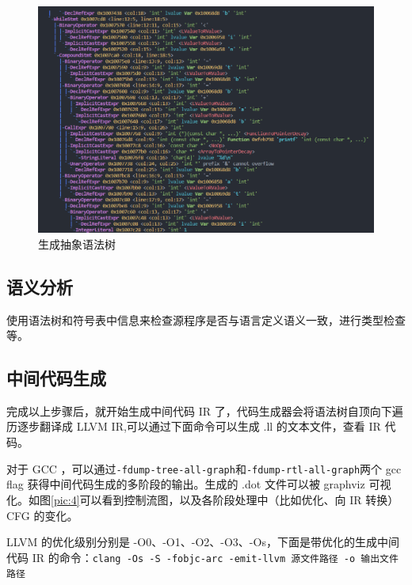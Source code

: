\documentclass[UTF8,a4paper,10pt]{ctexart}
\begin{document}
\begin{figure}[H]
  \centering
  \includegraphics[width=\textwidth]{figure/AST.png}
  \caption{生成抽象语法树}
  \label{pic:3}
\end{figure}

\subsection{语义分析}
使用语法树和符号表中信息来检查源程序是否与语言定义语义一致，进行类型检查等。

\subsection{中间代码生成}
完成以上步骤后，就开始生成中间代码 IR 了，代码生成器会将语法树自顶向下遍历逐步翻译成 LLVM IR,可以通过下面命令可以生成 .ll 的文本文件，查看 IR 代码。

对于 GCC ，可以通过\verb|-fdump-tree-all-graph|和\verb|-fdump-rtl-all-graph|两个 gcc flag 获得中间代码生成的多阶段的输出。生成的 .dot 文件可以被 graphviz 可视化。如图\ref{pic:4}可以看到控制流图，以及各阶段处理中（比如优化、向 IR 转换）CFG 的变化。

LLVM 的优化级别分别是 -O0、-O1、-O2、-O3、-Os，下面是带优化的生成中间代码 IR 的命令：\verb|clang -Os -S -fobjc-arc -emit-llvm 源文件路径 -o 输出文件路径|
\end{document}
